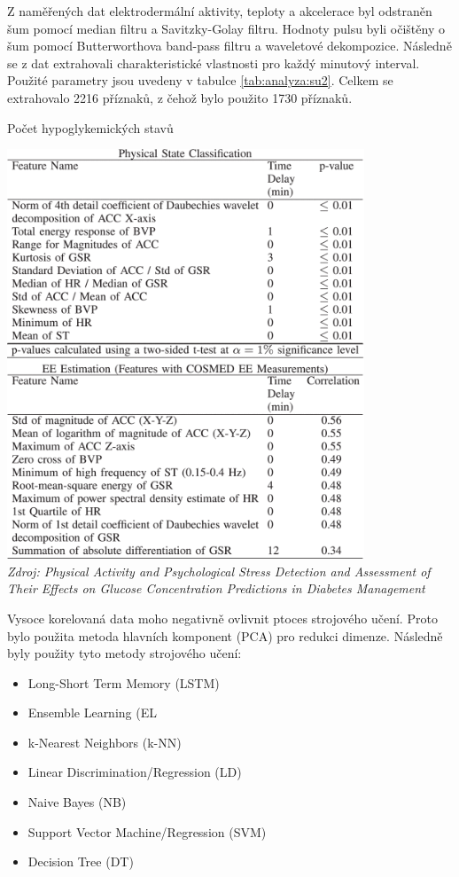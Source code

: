 Z naměřených dat elektrodermální aktivity, teploty a akcelerace byl odstraněn šum pomocí median filtru a Savitzky-Golay filtru. Hodnoty pulsu byli očištěny o šum pomocí Butterworthova band-pass filtru a waveletové dekompozice. Následně se z dat extrahovali charakteristické vlastnosti pro každý minutový interval. Použité parametry jsou uvedeny v tabulce \ref{tab:analyza:su2}. Celkem se extrahovalo 2216 příznaků, z čehož bylo použito 1730 příznaků.

\begin{table}[H]
\caption{Počet hypoglykemických stavů}
\label{tab:analyza:su2}
\centering
\includegraphics[width=0.8\textwidth]{img/analyzaPA/su2.png}\\
\textit{Zdroj: Physical Activity and Psychological Stress Detection and Assessment of Their Effects on Glucose Concentration Predictions in Diabetes Management \citep{analyzaPA.SU}}
\end{table}

Vysoce korelovaná data moho negativně ovlivnit ptoces strojového učení. Proto bylo použita metoda hlavních komponent (PCA) pro redukci dimenze. Následně byly použity tyto metody strojového učení:
\begin{itemize}
\setlength\itemsep{0em}
\item Long-Short Term Memory (LSTM)
\item Ensemble Learning (EL
\item k-Nearest Neighbors (k-NN)
\item Linear Discrimination/Regression (LD)
\item Naive Bayes (NB)
\item Support Vector Machine/Regression (SVM)
\item Decision Tree (DT)
\end{itemize}

